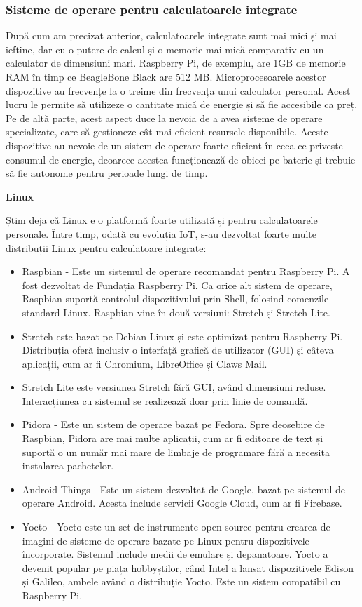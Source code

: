 \subsubsection{Sisteme de operare pentru calculatoarele integrate}
\label{sec:embed-ics-embed-os}

După cum am precizat anterior, calculatoarele integrate sunt mai mici și mai
ieftine, dar cu o putere de calcul și o memorie mai mică comparativ cu un
calculator de dimensiuni mari. Raspberry Pi, de exemplu, are 1GB de memorie RAM
în timp ce BeagleBone Black are 512 MB. Microprocesoarele acestor dispozitive au
frecvențe la o treime din frecvența unui calculator personal. Acest lucru le
permite să utilizeze o cantitate mică de energie și să fie accesibile ca preț.
Pe de altă parte, acest aspect duce la nevoia de a avea sisteme de operare
specializate, care să gestioneze cât mai eficient resursele disponibile. Aceste
dispozitive au nevoie de un sistem de operare foarte eficient în ceea ce
privește consumul de energie, deoarece acestea funcționează de obicei pe baterie
și trebuie să fie autonome pentru perioade lungi de timp.

\textbf{Linux}

Știm deja că Linux e o platformă foarte utilizată și pentru calculatoarele
personale. Între timp, odată cu evoluția IoT, s-au dezvoltat foarte multe
distribuții Linux pentru calculatoare integrate:

\begin{itemize}
	\item Raspbian - Este un sistemul de operare recomandat pentru Raspberry
		Pi. A fost dezvoltat de Fundația Raspberry Pi. Ca orice alt
		sistem de operare, Raspbian suportă controlul dispozitivului
		prin Shell, folosind comenzile standard Linux. Raspbian vine în
		două versiuni: Stretch și Stretch Lite.
	\item Stretch este bazat pe Debian Linux și este optimizat pentru
		Raspberry Pi. Distribuția oferă inclusiv o interfață grafică de
		utilizator (GUI) și câteva aplicații, cum ar fi Chromium,
		LibreOffice și Claws Mail.
	\item Stretch Lite este versiunea Stretch fără GUI, având dimensiuni
		reduse. Interacțiunea cu sistemul se realizează doar prin linie
		de comandă.
	\item Pidora - Este un sistem de operare bazat pe Fedora. Spre deosebire
		de Raspbian, Pidora are mai multe aplicații, cum ar fi editoare
		de text și suportă o un număr mai mare de limbaje de programare
		fără a necesita instalarea pachetelor.
	\item Android Things - Este un sistem dezvoltat de Google, bazat pe
		sistemul de operare Android. Acesta include servicii Google
		Cloud, cum ar fi Firebase.
	\item Yocto - Yocto este un set de instrumente open-source pentru
		crearea de imagini de sisteme de operare bazate pe Linux pentru
		dispozitivele încorporate. Sistemul include medii de emulare și
		depanatoare. Yocto a devenit popular pe piața hobbyștilor, când
		Intel a lansat dispozitivele Edison și Galileo, ambele având o
		distribuție Yocto. Este un sistem compatibil cu Raspberry Pi.
\end{itemize}


